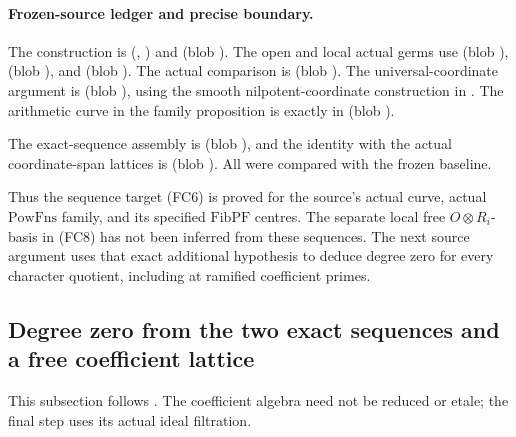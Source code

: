 \paragraph{Frozen-source ledger and precise boundary.}
The construction is
(, )
and 
(blob ).
The open and local actual germs use
(blob ),
(blob ),
and 
(blob ).
The actual comparison is 
(blob ).
The universal-coordinate argument is 
(blob ),
using the smooth nilpotent-coordinate construction
in .
The arithmetic curve in the family proposition is
exactly  in
(blob ).

The exact-sequence assembly is
(blob ),
and the identity with the actual coordinate-span lattices
is 
(blob ).
All were compared with the frozen baseline.

Thus the sequence target (FC6) is proved for the source's
actual curve, actual \(\mathrm{PowFns}\) family, and
its specified \(\mathrm{FibPF}\) centres.
The separate local free \(O\otimes R_i\)-basis in (FC8)
has not been inferred from these sequences.
The next source argument uses that exact additional
hypothesis to deduce degree zero for every character
quotient, including at ramified coefficient primes.

\subsection{Degree zero from the two exact sequences and a free coefficient lattice}
\label{subsec:faithful-character-quotient-degree-zero}

This subsection follows
.
The coefficient algebra need not be reduced or etale;
the final step uses its actual ideal filtration.

